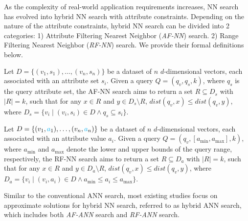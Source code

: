 \documentclass[sigconf, nonacm]{acmart}
\begin{document}
	As the complexity of real-world application requirements increases, NN search has evolved into hybrid NN search with attribute constraints. Depending on the nature of the attribute constraints, hybrid NN search can be divided into 2 categories: 1) Attribute Filtering Nearest Neighbor (\textit{AF-NN}) search. 2) Range Filtering Nearest Neighbor (\textit{RF-NN}) search. We provide their formal definitions below.
	
	\begin{definition}[AF-NN Search]
		Let \( D = \{(v_1, s_1), \ldots, (v_n, s_n)\} \) be a dataset of \( n \) \( d \)-dimensional vectors, each associated with an attribute set \( s_i \). Given a query \( Q = (q_v, q_s, k) \), where \( q_s \) is the query attribute set, the AF-NN search aims to return a set \( R \subseteq D_s \) with \( |R| = k \), such that for any \( x \in R \) and \( y \in D_s \setminus R \), \( \textit{dist}(q_v, x) \leq \textit{dist}(q_v, y) \), where \( D_s = \{ v_i \mid (v_i, s_i) \in D \land q_s \subseteq s_i \} \).
	\end{definition}
	
	
	\begin{definition}[RF-NN Search]
		
		Let \( D = \{(v_1, \textcolor{cyan}{a}_1), \ldots, (v_n, \textcolor{cyan}{a}_n)\} \) be a dataset of \( n \) \( d \)-dimensional vectors, each associated with an attribute value \( a_i \). Given a query \( Q = (q_v, [a_{\min}, a_{\max}], k) \), where \( a_{\min} \) and \( a_{\max} \) denote the lower and upper bounds of the query range, respectively, the RF-NN search aims to return a set \( R \subseteq D_a \) with \( |R| = k \), such that for any \( x \in R \) and \( y \in D_a \setminus R \), \( \textit{dist}(q_v, x) \leq \textit{dist}(q_v, y) \), where \( D_a = \{ v_i \mid (v_i, a_i) \in D \land a_{\min} \leq a_i \leq a_{\max} \} \).
	\end{definition}
	
	
	
	Similar to the conventional ANN search, most existing studies focus on approximate solutions for hybrid NN search, referred to as hybrid ANN search, which includes both \textit{AF-ANN} search and \textit{RF-ANN} search.
	
\end{document}
